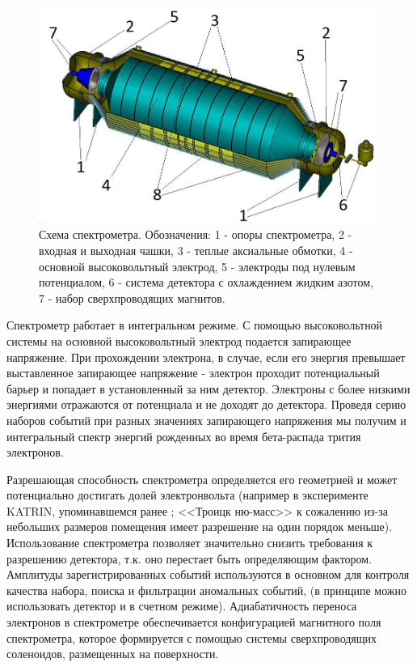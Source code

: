 \documentclass[a4paper,14pt]{extreport}
\begin{document}
\begin{figure}
  \centering
  \includegraphics[width = 0.99\textwidth]{img/nu_mass_setup/spectrometer.jpg}
    \caption{Схема спектрометра. Обозначения: 1 - опоры спектрометра, 2 - входная и выходная чашки, 3 - теплые аксиальные обмотки, 4 - основной высоковольтный электрод, 5 - электроды под нулевым потенциалом, 6 - система детектора с охлаждением жидким азотом, 7 - набор сверхпроводящих магнитов.}
    \label{fig:numass-spectrometer}
\end{figure}

Спектрометр работает в интегральном режиме. С помощью высоковольтной системы на основной высоковольтный электрод подается запирающее напряжение. При прохождении электрона, в случае, если его энергия превышает выставленное запирающее напряжение - электрон проходит потенциальный барьер и попадает в установленный за ним детектор. Электроны с более низкими энергиями отражаются от потенциала и не доходят до детектора. Проведя серию наборов событий при разных значениях запирающего напряжения мы получим и интегральный спектр энергий рожденных во время бета-распада трития электронов. 

Разрешающая способность спектрометра определяется его геометрией и может потенциально достигать долей электронвольта (например в эксперименте KATRIN, упоминавшемся ранее \cite{katrin-design-report-2004}; <<Троицк ню-масс>> к сожалению из-за небольших размеров помещения имеет разрешение на один порядок меньше). Использование спектрометра позволяет значительно снизить требования к разрешению детектора, т.к. оно перестает быть определяющим фактором. Амплитуды зарегистрированных событий используются в основном для контроля качества набора,  поиска и фильтрации аномальных событий, (в принципе можно использовать детектор и в счетном режиме). Адиабатичность переноса электронов в спектрометре обеспечивается конфигурацией магнитного поля спектрометра, которое формируется с помощью системы сверхпроводящих соленоидов, размещенных на поверхности.
\end{document}
